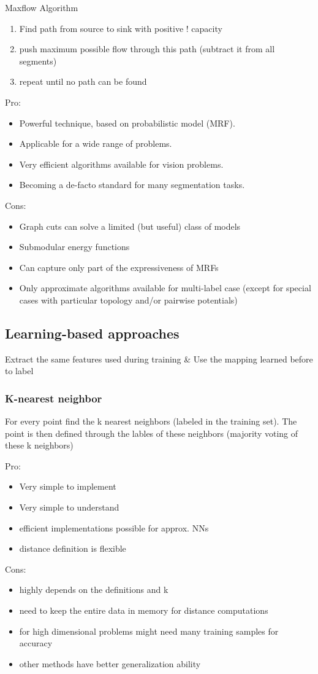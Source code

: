 Maxflow Algorithm
\begin{enumerate}
	\item Find path from source to sink with positive ! capacity
	\item push maximum possible flow through this path (subtract it from all segments)
	\item repeat until no path can be found
\end{enumerate}

Pro:
\begin{itemize}
	\item Powerful technique, based on probabilistic model (MRF).
	\item Applicable for a wide range of problems.
	\item Very efficient algorithms available for vision problems.
	\item Becoming a de-facto standard for many segmentation tasks.
\end{itemize}
Cons:
\begin{itemize}
	\item Graph cuts can solve a limited (but useful) class of models
	\item Submodular energy functions
	\item Can capture only part of the expressiveness of MRFs
	\item Only approximate algorithms available for multi-label case (except for special cases with particular topology and/or pairwise potentials)
\end{itemize}

\subsection{Learning-based approaches}
Extract the same features used during training \& Use the mapping learned before to label

\subsubsection{K-nearest neighbor}
For every point find the k nearest neighbors (labeled in the training set). The point is then defined through the lables of these neighbors (majority voting of these k neighbors)

Pro:
\begin{itemize}
	\item Very simple to implement
	\item Very simple to understand
	\item efficient implementations possible for approx. NNs
	\item distance definition is flexible
\end{itemize}
Cons:
\begin{itemize}
	\item highly depends on the definitions and k
	\item need to keep the entire data in memory for distance computations
	\item for high dimensional problems might need many training samples for accuracy
	\item other methods have better generalization ability
\end{itemize}

